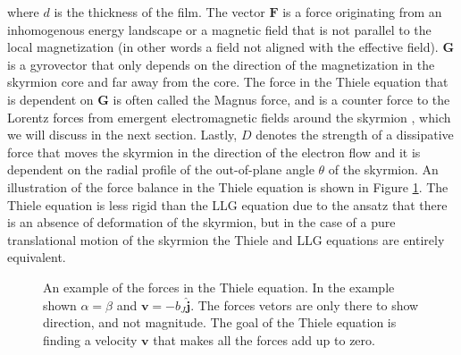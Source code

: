 where $d$ is the thickness of the film. The vector $\mathbold{F}$ is a force originating from an inhomogenous energy landscape or a magnetic field that is not parallel to the local magnetization (in other words a field not aligned with the effective field). $\mathbold{G}$ is a gyrovector that only depends on the direction of the magnetization in the skyrmion core and far away from the core. The force in the Thiele equation that is dependent on $\mathbold{G}$ is often called the Magnus force, and is a counter force to the Lorentz forces from emergent electromagnetic fields around the skyrmion \cite{Everschor-Sitte2014}, which we will discuss in the next section. Lastly, $D$ denotes the strength of a dissipative force that moves the skyrmion in the direction of the electron flow and it is dependent on the radial profile of the out-of-plane angle $\theta$ of the skyrmion. An illustration of the force balance in the Thiele equation is shown in Figure \ref{fig:Thiele}. The Thiele equation is less rigid than the LLG equation due to the ansatz that there is an absence of deformation of the skyrmion, but in the case of a pure translational motion of the skyrmion the Thiele and LLG equations are entirely equivalent.
\begin{figure}[h!]
\centering
  \centering
\caption{An example of the forces in the Thiele equation. In the example shown $\alpha=\beta$ and $\mathbold{v}=-b_J\mathbold{\hat{j}}$. The forces vetors are only there to show direction, and not magnitude. The goal of the Thiele equation is finding a velocity $\mathbold{v}$ that makes all the forces add up to zero.}
\label{fig:Thiele}
\end{figure}

